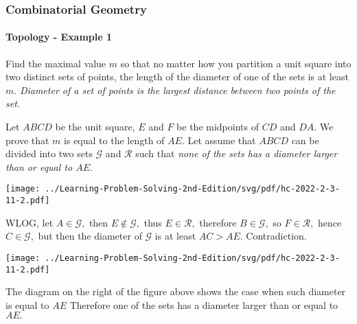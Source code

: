 \documentclass[8pt,xcolor=table,dvipsnames]{beamer}
\begin{document}
\begin{frame}[t]
    \frametitle{Combinatorial Geometry}
    \framesubtitle{Topology - Example 1}
    \begin{example}[HC-2022-SM2-R3-P11]
        Find the maximal value $m$ so that no matter how you partition
        a unit square into two distinct sets of points,
        the length of the diameter of one of the sets is at least $m.$ 
        \textit{Diameter of a set of points is the largest distance between two points of the set.}
    \end{example}
    \begin{overprint}
        Let $ABCD$ be the unit square, $E$ and $F$ be the midpoints of $CD$ and $DA.$
        We prove that $m$ is equal to the length of $AE.$
        Let assume that $ABCD$ can be divided into two sets $\mathcal{G}$ and $\mathcal{R}$ such that
        \textit{none of the sets has a diameter larger than or equal to $AE.$}
        \begin{center}
            \texttt{[image: ../Learning-Problem-Solving-2nd-Edition/svg/pdf/hc-2022-2-3-11-2.pdf]}
        \end{center}    
        WLOG, let $A \in \mathcal{G},$ then $E \not \in \mathcal{G},$ thus $E \in \mathcal{R},$
        therefore $B \in \mathcal{G},$ so $F \in \mathcal{R},$ hence $C \in \mathcal{G},$
        but then the diameter of $\mathcal{G}$ is at least $AC > AE.$
        Contradiction.
        \begin{center}
            \texttt{[image: ../Learning-Problem-Solving-2nd-Edition/svg/pdf/hc-2022-2-3-11-2.pdf]}
        \end{center}    
        The diagram on the right of the figure above shows
        the case when such diameter is equal to $AE$
        Therefore one of the sets has a diameter larger than or equal to $AE.$
    \end{overprint}
\end{frame}
\end{document}
